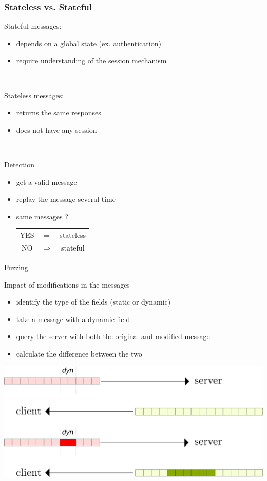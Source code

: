 \documentclass{beamer}
\newcounter{m} %
\newcounter{c} %
\begin{document}
\begin{frame}\frametitle{Stateless vs. Stateful}

  Stateful messages:
  \begin{itemize}
    \item depends on a global state (ex. authentication)
    \item require understanding of the session mechanism
  \end{itemize}

  ~

  Stateless messages: 
  \begin{itemize}
    \item returns the same responses
    \item does not have any session
  \end{itemize}

  ~

  \begin{block}{Detection}
    \begin{itemize}
      \item get a valid message
      \item replay the message several time
      \item same messages ? \begin{tabular}{ccc}YES &$\Rightarrow$& stateless\\NO &$\Rightarrow$& stateful\end{tabular}
    \end{itemize}
  \end{block}
\end{frame}

\begin{frame}{Fuzzing}

  Impact of modifications in the messages

  \begin{itemize}
    \item identify the type of the fields (static or dynamic)
    \item take a message with a dynamic field
    \item query the server with both the original and modified message
    \item calculate the difference between the two
  \end{itemize}

  \begin{center}\includegraphics[scale=0.4]{modify.png}\end{center}

\end{frame}
\end{document}

